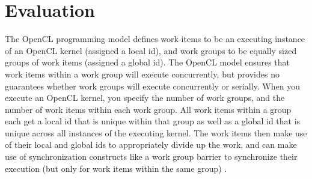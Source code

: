\documentclass[conference,10pt]{IEEEtran}
\begin{document}
%
%


\section{Evaluation}

The OpenCL programming model defines work items to be an executing instance of an OpenCL kernel 
(assigned a local id), and work groups to be equally sized groups of work items (assigned a global 
id). The OpenCL model ensures that work items within a work group will execute concurrently, but 
provides no guarantees whether work groups will execute concurrently or serially. When you execute 
an OpenCL kernel, you specify the number of work groups, and the number of work items within each 
work group. All work items within a group each get a local id that is unique within that group as 
well as a global id that is unique across all instances of the executing kernel. The work items then 
make use of their local and global ids to appropriately divide up the work, and can make use of 
synchronization constructs like a work group barrier to synchronize their execution (but only for 
work items within the same group) \cite{opencl_guide}.
\end{document}
